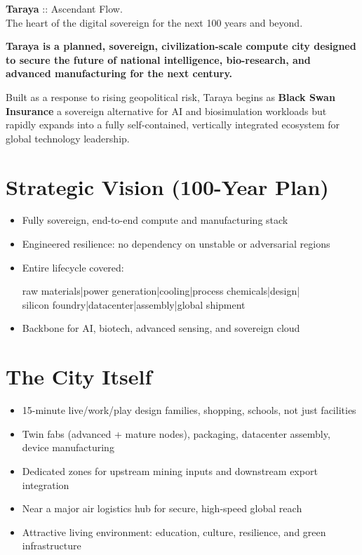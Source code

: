 \documentclass[12pt]{article}
\begin{document}
    \begin{center}
    {\huge \textbf{Taraya}} {\Large :: Ascendant Flow.}\\[0.25em]
    {\large The heart of the digital sovereign for the next 100 years and beyond.}\\[1.25em]
    \end{center}

    \begin{spacing}{1.1}

        \noindent
        \textbf{Taraya is a planned, sovereign, civilization-scale compute city \textemdash{} designed to secure the future of national intelligence, bio-research, and advanced manufacturing for the next century.}

        \noindent
        Built as a response to rising geopolitical risk, Taraya begins as \textbf{Black Swan Insurance} \textemdash{} a sovereign alternative for AI and biosimulation workloads \textemdash{} but rapidly expands into a fully self-contained, vertically integrated ecosystem for global technology leadership.

        \section*{Strategic Vision (100-Year Plan)}
        \begin{itemize}
            \item Fully sovereign, end-to-end compute and manufacturing stack
            \item Engineered resilience: no dependency on unstable or adversarial regions
            \item Entire lifecycle covered:
            \begin{center}
                raw materials|power generation|cooling|process chemicals|design| \\
                silicon foundry|datacenter|assembly|global shipment
            \end{center}
            \item Backbone for AI, biotech, advanced sensing, and sovereign cloud
        \end{itemize}

        \section*{The City Itself}
        \begin{itemize}
            \item 15-minute live/work/play design \textemdash{} families, shopping, schools, not just facilities
            \item Twin fabs (advanced + mature nodes), packaging, datacenter assembly, device manufacturing
            \item Dedicated zones for upstream mining inputs and downstream export integration
            \item Near a major air logistics hub for secure, high-speed global reach
            \item Attractive living environment: education, culture, resilience, and green infrastructure
        \end{itemize}


\end{spacing}
\end{document}
